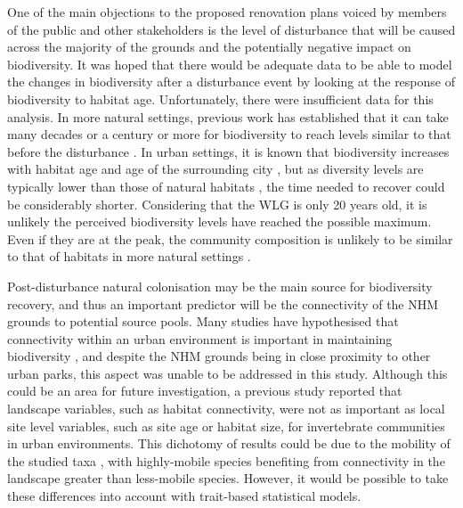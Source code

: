 One of the main objections to the proposed renovation plans voiced by members of the public and other stakeholders is the level of disturbance that will be caused across the majority of the grounds and the potentially negative impact on biodiversity. It was hoped that there would be adequate data to be able to model the changes in biodiversity after a disturbance event by looking at the response of biodiversity to habitat age. Unfortunately, there were insufficient data for this analysis.  In more natural settings, previous work has established that it can take many decades \citep{Hirst:2005jae} or a century or more \citep{Vellend:2006ecol} for biodiversity to reach levels similar to that before the disturbance . In urban settings, it is known that biodiversity increases with habitat age \citep{Yamaguchi:2004er,Sattler:2010le} and age of the surrounding city \citep{Aronson:2014procb}, but as diversity levels are typically lower than those of natural habitats \citep{Bates:2011po,Ockinger:2009lup}, the time needed to recover could be considerably shorter. Considering that the WLG is only 20 years old, it is unlikely the perceived biodiversity levels have reached the possible maximum. Even if they are at the peak, the community composition is unlikely to be similar to that of habitats in more natural settings \citep{Angold:2006ste}. 

Post-disturbance natural colonisation may be the main source for biodiversity recovery, and thus an important predictor will be the connectivity of the NHM grounds to potential source pools.  Many studies have hypothesised that connectivity within an urban environment is important in maintaining biodiversity \citep{Ockinger:2009lup,Goddard:2010tree,Kong:2010lup,Vergnes:2012bc}, and despite the NHM grounds being in close proximity to other urban parks, this aspect was unable to be addressed in this study. Although this could be an area for future investigation, a previous study \citep{Angold:2006ste} reported that landscape variables, such as habitat connectivity, were not as important as local site level variables, such as site age or habitat size, for invertebrate communities in urban environments. This dichotomy of results could be due to the mobility of the studied taxa \citep{Braaker:2014ec}, with highly-mobile species benefiting from connectivity in the landscape greater than less-mobile species.  However, it would be possible to take these differences into account with trait-based statistical models.

